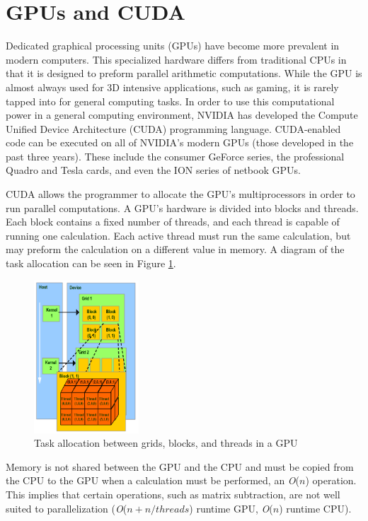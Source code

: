 \documentclass[10pt,twocolumn,twoside]{IEEEtran}
\renewcommand{\O}[1]{\textit{O}(\ensuremath{#1})}
\begin{document}
\section{GPUs and CUDA}
Dedicated graphical processing units (GPUs) have become more prevalent in modern computers. This specialized hardware differs from traditional CPUs in that it is designed to preform parallel arithmetic computations. While the GPU is almost always used for 3D intensive applications, such as gaming, it is rarely tapped into for general computing tasks. In order to use this computational power in a general computing environment, NVIDIA has developed the Compute Unified Device Architecture (CUDA) programming language. CUDA-enabled code can be executed on all of NVIDIA's modern GPUs (those developed in the past three years). These include the consumer GeForce series, the professional Quadro and Tesla cards, and even the ION series of netbook GPUs.
	
CUDA allows the programmer to allocate the GPU's multiprocessors in order to run parallel computations. A GPU's hardware is divided into blocks and threads. Each block contains a fixed number of threads, and each thread is capable of running one calculation. Each active thread must run the same calculation, but may preform the calculation on a different value in memory. A diagram of the task allocation can be seen in Figure \ref{fig:cudaBlocks}.

\begin{figure}[h]
\begin{center}
\includegraphics[width=0.35\textwidth]{Images/cudaBlocks.png}
\caption{Task allocation between grids, blocks, and threads in a GPU}
\label{fig:cudaBlocks}
\end{center}
\end{figure}
	
Memory is not shared between the GPU and the CPU and must be copied from the CPU to the GPU when a calculation must be performed, an \O{n} operation. This implies that certain operations, such as matrix subtraction, are not well suited to parallelization (\O{n + n/threads} runtime GPU, \O{n} runtime CPU).
\end{document}
